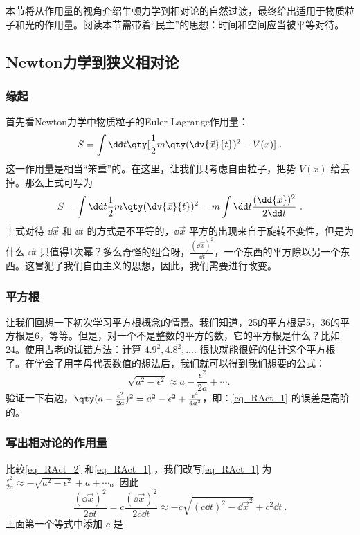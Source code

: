 
本节将从作用量的视角介绍牛顿力学到相对论的自然过渡，最终给出适用于物质粒子和光的作用量。阅读本节需带着“民主”的思想：时间和空间应当被平等对待。
\subsection{Newton力学到狭义相对论}
\subsubsection{缘起}
首先看Newton力学中物质粒子的Euler-Lagrange作用量：
\begin{equation}
S=\int\dd t\qty[\frac{1}{2}m\qty(\dv{\vec x}{t})^2-V(x)]~.
\end{equation}
这一作用量是相当“笨重”的。在这里，让我们只考虑自由粒子，把势 $V(x)$ 给丢掉。那么上式可写为
\begin{equation}\label{eq_RAct_2}
S=\int\dd t\frac{1}{2}m\qty(\dv{\vec x}{t})^2=m\int\dd t\frac{(\dd{\vec x})^2}{2\dd t}~.
\end{equation}
上式对待 $\dd{\vec x}$ 和 $\dd t$ 的方式是不平等的，$\dd{\vec x}$ 平方的出现来自于旋转不变性，但是为什么 $\dd t$ 只值得1次幂？多么奇怪的组合呀，$\frac{(\dd{\vec x})^2}{\dd t}$，一个东西的平方除以另一个东西。这冒犯了我们自由主义的思想，因此，我们需要进行改变。

\subsubsection{平方根}
让我们回想一下初次学习平方根概念的情景。我们知道，25的平方根是5，36的平方根是6，等等。但是，对一个不是整数的平方的数，它的平方根是什么？比如24。使用古老的试错方法：计算 $4.9^2,4.8^2,\ldots.$ 很快就能很好的估计这个平方根了。在学会了用字母代表数值的想法后，我们就可以得到我们想要的公式：
\begin{equation}\label{eq_RAct_1}
\sqrt{a^2-\epsilon^2}\approx a-\frac{\epsilon^2}{2a}+\cdots.~
\end{equation}
验证一下右边，$\qty(a-\frac{\epsilon^2}{2a})^2=a^2-\epsilon^2+\frac{\epsilon^4}{4a^2}$，即：\autoref{eq_RAct_1} 的误差是高阶的。

\subsubsection{写出相对论的作用量}
比较\autoref{eq_RAct_2} 和\autoref{eq_RAct_1} ，我们改写\autoref{eq_RAct_1} 为
$
\frac{\epsilon^2}{2a}\approx-\sqrt{a^2-\epsilon^2}+ a+\cdots
$。因此
\begin{equation}
\frac{(\dd{\vec x})^2}{2\dd t}=c\frac{(\dd{\vec x})^2}{2c\dd t}\approx-c\sqrt{(c\dd t)^2-\dd{\vec x}^2}+c^2\dd t~.
\end{equation}
上面第一个等式中添加 $c$ 是


